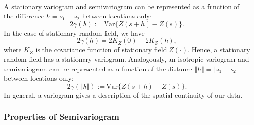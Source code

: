 \documentclass{article}
\begin{document}
\paragraph{} A stationary variogram and semivariogram can be represented as a function of the difference $h=s_1-s_2$ between locations only:
\begin{equation*}
	2\gamma(h) := \mathrm{Var}\lbrace Z(s + h) - Z(s)\rbrace.\tag{1.8}
\end{equation*}
In the case of stationary random field, we have
\begin{equation*}
	2\gamma(h) = 2K_Z(0) - 2K_Z(h),\tag{1.9}
\end{equation*}
where $K_Z$ is the covariance function of stationary field $Z(\cdot)$. Hence, a stationary random field has a stationary variogram. Analogously, an isotropic variogram and semivariogram can be represented as a function of the distance $\Vert h\Vert = \Vert s_1-s_2\Vert$ between locations only:
\begin{equation*}
2\gamma(\Vert h\Vert) := \mathrm{Var}\lbrace Z(s + h) - Z(s)\rbrace.\tag{1.10}
\end{equation*}
In general, a variogram gives a description of the spatial continuity of our data.

\subsubsection{Properties of Semivariogram}
\end{document}
